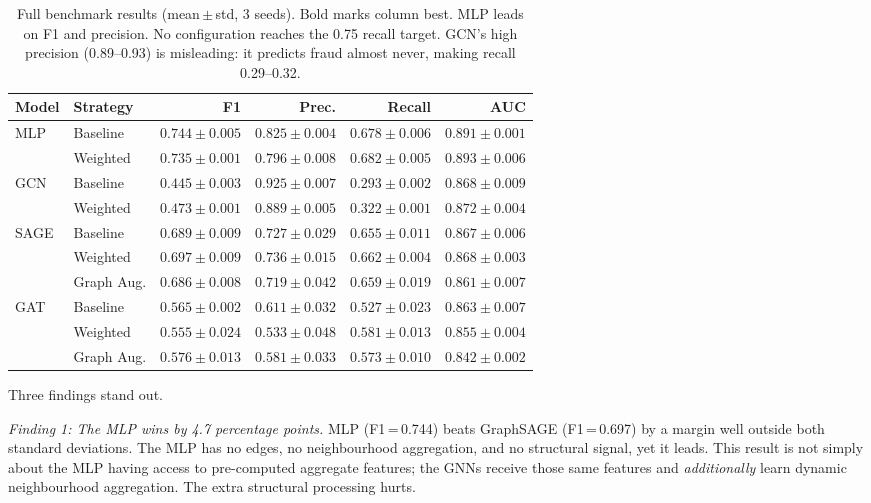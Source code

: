 \begin{table}[!htbp]
\centering
\caption{Full benchmark results (mean\,$\pm$\,std, 3 seeds).  Bold
marks column best.  MLP leads on F1 and precision.  No configuration
reaches the 0.75 recall target.  GCN's high precision (0.89--0.93) is
misleading: it predicts fraud almost never, making recall 0.29--0.32.}
\label{tab:main_results}
\small
\begin{tabular}{llrrrr}
\toprule
\textbf{Model} & \textbf{Strategy}
  & \textbf{F1} & \textbf{Prec.}
  & \textbf{Recall} & \textbf{AUC} \\
\midrule
\multirow{2}{*}{MLP}
  & Baseline
    & $\mathbf{0.744\!\pm\!0.005}$ & $\mathbf{0.825\!\pm\!0.004}$
    & $0.678\!\pm\!0.006$ & $0.891\!\pm\!0.001$ \\
  & Weighted
    & $0.735\!\pm\!0.001$ & $0.796\!\pm\!0.008$
    & $0.682\!\pm\!0.005$ & $\mathbf{0.893\!\pm\!0.006}$ \\
\midrule
\multirow{2}{*}{GCN}
  & Baseline
    & $0.445\!\pm\!0.003$ & $0.925\!\pm\!0.007$
    & $0.293\!\pm\!0.002$ & $0.868\!\pm\!0.009$ \\
  & Weighted
    & $0.473\!\pm\!0.001$ & $0.889\!\pm\!0.005$
    & $0.322\!\pm\!0.001$ & $0.872\!\pm\!0.004$ \\
\midrule
\multirow{3}{*}{SAGE}
  & Baseline
    & $0.689\!\pm\!0.009$ & $0.727\!\pm\!0.029$
    & $0.655\!\pm\!0.011$ & $0.867\!\pm\!0.006$ \\
  & Weighted
    & $0.697\!\pm\!0.009$ & $0.736\!\pm\!0.015$
    & $0.662\!\pm\!0.004$ & $0.868\!\pm\!0.003$ \\
  & Graph Aug.
    & $0.686\!\pm\!0.008$ & $0.719\!\pm\!0.042$
    & $0.659\!\pm\!0.019$ & $0.861\!\pm\!0.007$ \\
\midrule
\multirow{3}{*}{GAT}
  & Baseline
    & $0.565\!\pm\!0.002$ & $0.611\!\pm\!0.032$
    & $0.527\!\pm\!0.023$ & $0.863\!\pm\!0.007$ \\
  & Weighted
    & $0.555\!\pm\!0.024$ & $0.533\!\pm\!0.048$
    & $\mathbf{0.581\!\pm\!0.013}$ & $0.855\!\pm\!0.004$ \\
  & Graph Aug.
    & $0.576\!\pm\!0.013$ & $0.581\!\pm\!0.033$
    & $0.573\!\pm\!0.010$ & $0.842\!\pm\!0.002$ \\
\bottomrule
\end{tabular}
\end{table}

Three findings stand out.

\textit{Finding 1: The MLP wins by 4.7 percentage points.}  MLP
(F1\,=\,0.744) beats GraphSAGE (F1\,=\,0.697) by a margin well
outside both standard deviations.  The MLP has no edges, no
neighbourhood aggregation, and no structural signal, yet it leads.
This result is not simply about the MLP having access to pre-computed
aggregate features; the GNNs receive those same features and
\emph{additionally} learn dynamic neighbourhood aggregation.
The extra structural processing hurts.

